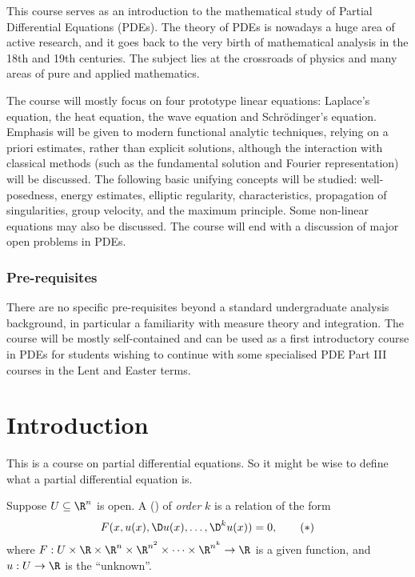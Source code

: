 \documentclass[a4paper]{article}
\begin{document}
\maketitle
{\small
\setlength{\parindent}{0em}
\setlength{\parskip}{1em}

This course serves as an introduction to the mathematical study of Partial Differential Equations (PDEs). The theory of PDEs is nowadays a huge area of active research, and it goes back to the very birth of mathematical analysis in the 18th and 19th centuries. The subject lies at the crossroads of physics and many areas of pure and applied mathematics.

The course will mostly focus on four prototype linear equations: Laplace's equation, the heat equation, the wave equation and Schr\"odinger's equation. Emphasis will be given to modern functional analytic techniques, relying on a priori estimates, rather than explicit solutions, although the interaction with classical methods (such as the fundamental solution and Fourier representation) will be discussed. The following basic unifying concepts will be studied: well-posedness, energy estimates, elliptic regularity, characteristics, propagation of singularities, group velocity, and the maximum principle. Some non-linear equations may also be discussed. The course will end with a discussion of major open problems in PDEs.

\subsubsection*{Pre-requisites}
There are no specific pre-requisites beyond a standard undergraduate analysis background, in particular a familiarity with measure theory and integration. The course will be mostly self-contained and can be used as a first introductory course in PDEs for students wishing to continue with some specialised PDE Part III courses in the Lent and Easter terms.
}
\tableofcontents

\section{Introduction}
This is a course on partial differential equations. So it might be wise to define what a partial differential equation is.

\begin{defi}
  Suppose $U \subseteq \R^n$ is open. A  () of \emph{order} $k$ is a relation of the form
  \[
    F(x, u(x), \D u(x), \ldots, \D^k u(x)) = 0,\tag{$*$}
  \]
  where $F: U \times \R \times \R^n \times \R^{n^2} \times \cdots \times \R^{n^k} \to \R$ is a given function, and $u: U \to \R$ is the ``unknown''.
\end{defi}
\end{document}
